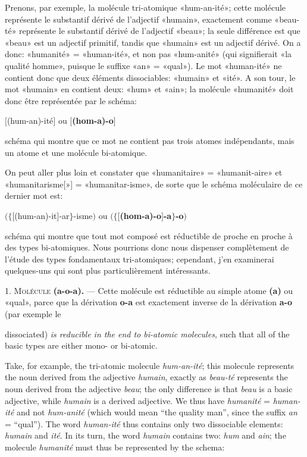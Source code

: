 \begin{sloppypar}
{{     Prenons, par exemple, la molécule tri-atomique «hum-an-ité»;
     cette molécule représente le substantif dérivé de l’adjectif
     «humain», exactement comme «beau-té» représente le substantif
     dérivé de l'adjectif «beau»; la seule différence est que «beau»
     est un adjectif primitif, tandis que «humain» est un adjectif
     dérivé. On a donc: «humanité» = «human-ité», et non pas
     «hum-anité» (qui signifierait «la qualité homme», puisque le
     suffixe «an» = «qual»). Le mot «human-ité» ne contient donc que
     deux éléments dissociables: «humain» et «ité». A son tour, le mot
     «humain» en contient deux: «hum» et «ain»; la molécule «humanité»
     doit donc être représentée par le schéma:

     \begin{center}
       {$\big[$(hum-an)-ité$\big]$} ou {$\big[$\textbf{(hom-a)-o}$\big]$}
     \end{center}
     schéma qui montre que ce mot ne contient pas trois atomes
     indépendants, mais un atome et une molécule bi-atomique.

     On peut aller plus loin et constater que «humanitaire» =
     «humanit-aire» et «humanitarisme[»] = «humanitar-isme», de sorte
     que le schéma moléculaire de ce dernier mot est:

     \begin{center}
       $\big(\big\{\big[$(hum-an)-it$\big]$-ar$\big\}$-isme$\big)$ ou
       $\big(\big\{\big[$\textbf{(hom-a)-o}$\big]$\textbf{-a}$\big\}$\textbf{-o}$\big)$
     \end{center}
     schéma qui montre que tout mot composé est réductible de proche
     en proche à des types bi-atomiques. Nous pourrions donc nous
     dispenser complètement de l’étude des types fondamentaux
     tri-atomiques; cependant, j’en examinerai quelques-uns qui sont
     plus particulièrement intéressants.

     1. \textsc{Molécule} \textbf{(a-o-a).} — Cette molécule est
     réductible au simple atome \textbf{(a)} ou «qual», parce que la
     dérivation \textbf{o-a} est exactement inverse de la dérivation
     \textbf{a-o} (par exemple le}

 }
 {\noindent
   {\small
     dissociated) \emph{is reducible in the end to bi-atomic
       molecules,} such that all of the basic types are either mono-
     or bi-atomic.

     Take, for example, the tri-atomic molecule \emph{hum-an-ité}; this
     molecule represents the noun derived from the adjective
     \emph{humain}, exactly as \emph{beau-té} represents the noun derived
     from the adjective \emph{beau}; the only difference is that \emph{beau}
     is a basic adjective, while \emph{humain} is a derived adjective. We
     thus have \emph{humanité} = \emph{human-ité} and not
     \emph{hum-anité} (which would mean ``the quality man'', since the
     suffix \emph{an} = ``qual''). The word \emph{human-ité} thus contains
     only two dissociable elements: \emph{humain} and \emph{ité}. In its
     turn, the word \emph{humain} contains two: \emph{hum} and \emph{ain}; the
     molecule \emph{humanité} must thus be represented by the schema:

}}
\end{sloppypar}
